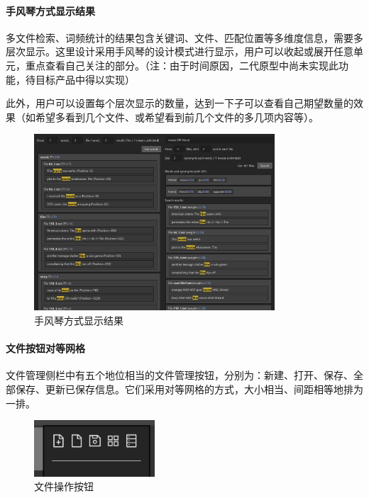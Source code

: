 \documentclass[scheme = chinese]{ctexart}
\begin{document}
\paragraph{手风琴方式显示结果}
多文件检索、词频统计的结果包含关键词、文件、匹配位置等多维度信息，需要多层次显示。这里设计采用手风琴的设计模式进行显示，用户可以收起或展开任意单元，重点查看自己关注的部分。（注：由于时间原因，二代原型中尚未实现此功能，待目标产品中得以实现）

此外，用户可以设置每个层次显示的数量，达到一下子可以查看自己期望数量的效果（如希望多看到几个文件、或希望看到前几个文件的多几项内容等）。

\begin{figure}[h]
    \centering
    \includegraphics[width=0.8\textwidth]{images/形式-检索结果.png}
    \caption{手风琴方式显示结果}
\end{figure}

\clearpage

\paragraph{文件按钮对等网格}
文件管理侧栏中有五个地位相当的文件管理按钮，分别为：新建、打开、保存、全部保存、更新已保存信息。它们采用对等网格的方式，大小相当、间距相等地排为一排。

\begin{figure}[h]
    \centering
    \includegraphics[width=0.4\textwidth]{images/形式-文件按钮.png}
    \caption{文件操作按钮}
\end{figure}
\end{document}
